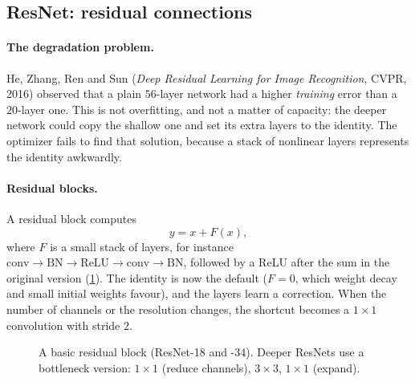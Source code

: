 \begin{notechapter}
\section{ResNet: residual connections}\label{cnn-architectures:sec:resnet}

\paragraph{The degradation problem.} He, Zhang, Ren and Sun (\emph{Deep Residual Learning
for Image Recognition}, CVPR, 2016) observed that a plain $56$-layer network had a higher
\emph{training} error than a $20$-layer one. This is not overfitting, and not a matter of capacity: the
deeper network could copy the shallow one and set its extra layers to the identity. The
optimizer fails to find that solution, because a stack of nonlinear layers represents the
identity awkwardly.

\paragraph{Residual blocks.} A residual block computes
\[
  y = x + F(x),
\]
where $F$ is a small stack of layers, for instance $\mathrm{conv}\to\mathrm{BN}\to\mathrm{ReLU}\to\mathrm{conv}\to\mathrm{BN}$, followed by a ReLU after the sum
in the original version (\cref{cnn-architectures:fig:resblock}). The identity is now the default
($F = 0$, which weight decay and small initial weights favour), and the layers learn a
correction. When the number of channels or the resolution changes, the shortcut becomes a
$1\times1$ convolution with stride $2$.

\begin{figure}[ht]
\centering
{}
\caption{A basic residual block (ResNet-18 and -34). Deeper ResNets use a bottleneck version:
$1\times1$ (reduce channels), $3\times3$, $1\times1$ (expand).}
\label{cnn-architectures:fig:resblock}
\end{figure}


\end{notechapter}
